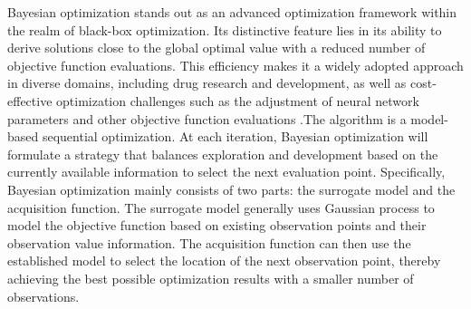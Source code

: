 \documentclass{article}
\begin{document}
\hspace{2em}
Bayesian optimization stands out as an advanced optimization framework within the realm of black-box optimization. Its distinctive feature lies in its ability to derive solutions close to the global optimal value with a reduced 
number of objective function evaluations. This efficiency makes it a widely adopted approach in diverse domains, including drug research and development, as well as cost-effective optimization challenges such as the adjustment 
of neural network parameters and other objective function evaluations \citep{Shahriari2016taking}.The algorithm is a model-based sequential optimization. At each iteration, Bayesian optimization will formulate a strategy that balances exploration and development based on the currently available information to select the next evaluation point. Specifically, Bayesian optimization mainly consists of two parts: the surrogate model and the acquisition function. The surrogate model generally uses Gaussian process \citep{Rasmussen2005Gaussian} to model the objective function based on existing observation points and their observation value information. The acquisition function can then use the established model to select the location of the next observation point, thereby achieving the best possible optimization results with a smaller number of observations.
\end{document}

